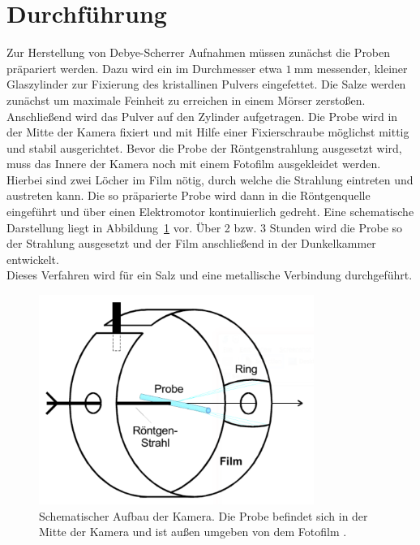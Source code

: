 \section{Durchführung}
\label{sec:durchführung}

Zur Herstellung von Debye-Scherrer Aufnahmen müssen zunächst die Proben präpariert werden. Dazu wird ein im Durchmesser
etwa $\SI{1}{\milli\meter}$ messender, kleiner Glaszylinder zur Fixierung des kristallinen Pulvers eingefettet.
Die Salze werden zunächst um maximale Feinheit zu erreichen in einem Mörser zerstoßen. Anschließend wird das Pulver
auf den Zylinder aufgetragen. Die Probe wird in der Mitte der Kamera fixiert und mit Hilfe einer Fixierschraube möglichst
mittig und stabil ausgerichtet. Bevor die Probe der Röntgenstrahlung ausgesetzt wird, muss das Innere der Kamera
noch mit einem Fotofilm ausgekleidet werden. Hierbei sind zwei Löcher im Film nötig, durch welche die Strahlung
eintreten und austreten kann. Die so präparierte Probe wird dann in die Röntgenquelle eingeführt und über einen
Elektromotor kontinuierlich gedreht. Eine schematische Darstellung liegt in Abbildung~\ref{fig:aufbau} vor.
Über 2 bzw. 3 Stunden wird die Probe so der Strahlung ausgesetzt und der Film anschließend in der Dunkelkammer entwickelt. \\
Dieses Verfahren wird für ein Salz und eine metallische Verbindung durchgeführt.
%
\begin{figure}[htb]
  \centering
  \includegraphics[width=0.8\textwidth]{figures/plot_aufbau.pdf}
  \caption{Schematischer Aufbau der Kamera. Die Probe befindet sich in der Mitte der Kamera und ist außen umgeben von dem Fotofilm \cite{V41}.}
  \label{fig:aufbau}
\end{figure}
%
